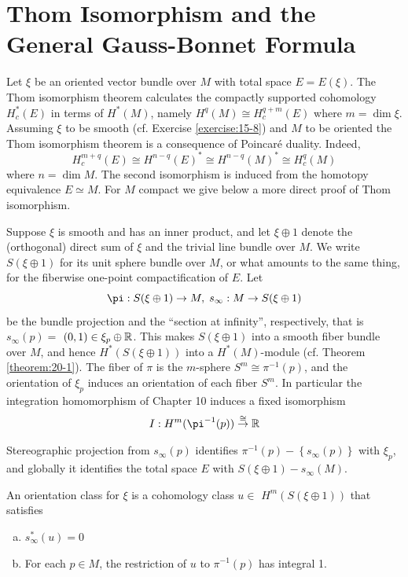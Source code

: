 \chapter[Thom Isomorphism and the General Gauss-Bonnet Formula]{Thom Isomorphism and the General\IfFontTimesTF{\\}{} Gauss-Bonnet Formula}
Let $\xi$ be an oriented vector bundle over $M$ with total space $E = E( \xi )$. The Thom isomorphism theorem 
calculates the compactly supported cohomology $H_c^*( E)$ in terms of ${H}^*( M)$, 
namely ${H}^{q}( M)  \cong  H_c^{q + m}(E)$ where $m = \dim \xi$. Assuming $\xi$ to be 
smooth (cf. Exercise \ref{exercise:15-8}) and $M$ to be oriented the Thom isomorphism theorem is a consequence of 
Poincar\'e duality. Indeed,
\[
  H_c^{m + q}( E)  
  \cong  {H}^{n- q}{( E) }^* 
  \cong  {H}^{n- q}{( M) }^* 
  \cong  H_c^{q}( M)
\]
where $n = \dim M$. The second isomorphism is induced from the homotopy equivalence $E \simeq  M$. 
For $M$ compact we give below a more direct proof of Thom isomorphism.

Suppose $\xi$ is smooth and has an inner product, and let $\xi  \oplus  1$ denote the (orthogonal) direct 
sum of $\xi$ and the trivial line bundle over $M$. We write $S( {\xi  \oplus  1})$ for its unit sphere bundle 
over $M$, or what amounts to the same thing, for the fiberwise one-point compactification of $E$. Let
\[
  \pi: S( {\xi  \oplus  1})  \ra  M,\;{s}_{\infty } : M \ra  S( {\xi  \oplus  1})
\]
be the bundle projection and the ``section at infinity'', respectively, that 
is ${s}_{\infty }( p)  =$  $( {0,1})  \in  {\xi }_{p} \oplus  {\ensuremath{\mathbb{R}}}$. This makes $S( {\xi  \oplus  1})$ into 
a smooth fiber bundle over $M$, and hence ${H}^*( {S( {\xi  \oplus  1}) })$ into a ${H}^*( M)$-module 
(cf. Theorem \ref{theorem:20-1}). The fiber of $\pi$ is the $m$-sphere ${S}^{m} \cong  {\pi }^{-1}( p)$, and the 
orientation of ${\xi }_{p}$ induces an orientation of each fiber ${S}^{m}$. In particular the integration homomorphism 
of Chapter 10 induces a fixed isomorphism
\begin{align}\label{eq:21-1}
  I: H^m( {{\pi }^{-1}( p) }) \overset{ \cong  }{ \ra  }\RR
\end{align}

Stereographic projection from ${s}_{\infty }( p)$ identifies ${\pi }^{-1}( p) - \left\{  {{s}_{\infty }( p) }\right\}$ 
with ${\xi }_{p}$, and globally it identifies the total space $E$ with $S( {\xi  \oplus  1}) - {s}_{\infty }( M)$.

\begin{definition}\label{definition:21-1}
  An orientation class for $\xi$ is a cohomology class $u \in$  $H^m( {S( {\xi  \oplus  1}) })$ that satisfies
  \begin{enumerate}[(a)]
    \item ${s}_{\infty }^*( u)  = 0$
    \item For each $p \in  M$, the restriction of $u$ to ${\pi }^{-1}( p)$ has integral 1.
  \end{enumerate}
\end{definition}

